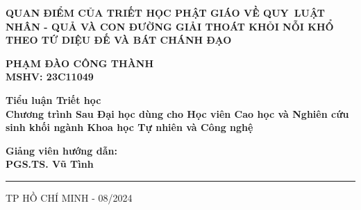 \begin{titlepage}
\begin{center}
\begin{figure}[htb]
    \end{figure}
\end{center}
\begin{center}
	{\large \bfseries QUAN ĐIỂM CỦA TRIẾT HỌC PHẬT GIÁO VỀ QUY~LUẬT NHÂN - QUẢ VÀ CON ĐƯỜNG GIẢI THOÁT KHỎI NỖI KHỔ THEO TỨ DIỆU ĐẾ VÀ BÁT CHÁNH ĐẠO \\ [1.5cm]}
\end{center}


\begin{center}
    {\large \bfseries PHẠM ĐÀO CÔNG THÀNH \\ MSHV: 23C11049 \\  [1.5cm]}
   
\end{center}

\begin{center}
	{ \large \bfseries Tiểu luận Triết học \\ Chương trình Sau Đại học dùng cho Học viên Cao học và Nghiên cứu sinh khối ngành Khoa học Tự nhiên và Công nghệ\\[1.5cm]} 
\end{center}


\begin{center}
    {\large \bfseries Giảng viên hướng dẫn: \\ PGS.TS. Vũ Tình \\ }
\end{center}


\vspace{1.0cm}
\begin{center}
    \rule{60mm}{0.1mm}
\end{center}
\begin{center}   
    \large TP HỒ CHÍ MINH - 08/2024
\end{center}

\end{titlepage}